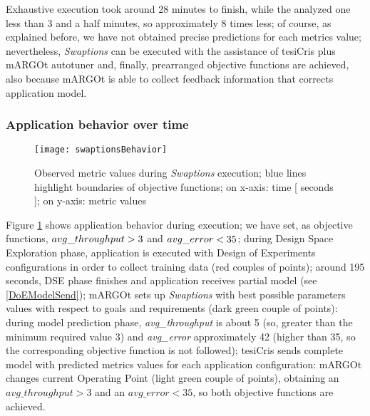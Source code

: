 Exhaustive execution took around 28 minutes to finish, while the analyzed one less than 3 and a half minutes, so approximately 8 times less; of course, as explained before, we have not obtained precise predictions for each metrics value; nevertheless, \textit{Swaptions} can be executed with the assistance of tesiCris plus mARGOt autotuner and, finally, prearranged objective functions are achieved, also because mARGOt is able to collect feedback information that corrects application model.


\subsubsection{Application behavior over time}

\begin{figure}[H]

    \centering
    
    \texttt{[image: swaptionsBehavior]}
    
    \caption{Observed metric values during \textit{Swaptions} execution; blue lines highlight boundaries of objective functions; on x-axis: time [ seconds ]; on y-axis: metric values}
    
    \label{fig::sw::beh}
    
\end{figure}

Figure \ref{fig::sw::beh} shows application behavior during execution; we have set, as objective functions, $avg\_\-throughput > 3$ and $avg\_\-error < 35$; during Design Space Exploration phase, application is executed with Design of Experiments configurations in order to collect training data (red couples of points); around 195 seconds, DSE phase finishes and application receives partial model (see \ref{DoEModelSend}); mARGOt sets up \textit{Swaptions} with best possible parameters values with respect to goals and requirements (dark green couple of points): during model prediction phase, \textit{avg\_throughput} is about 5 (so, greater than the minimum required value 3) and \textit{avg\_error} approximately 42 (higher than 35, so the corresponding objective function is not followed); tesiCris sends complete model with predicted metrics values for each application configuration: mARGOt changes current Operating Point (light green couple of points), obtaining an $avg\_throughput > 3$ and an $avg\_error < 35$, so both objective functions are achieved. 
